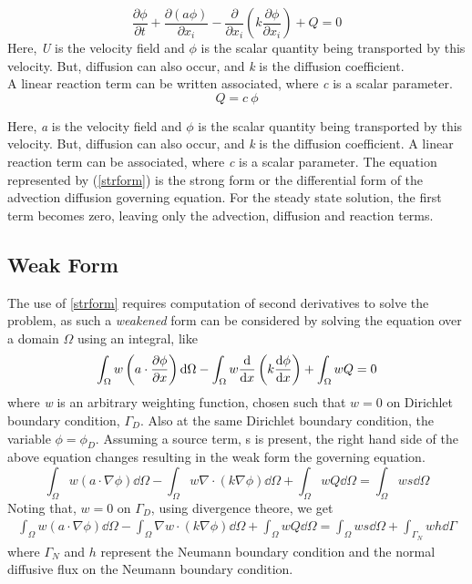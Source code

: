 \documentclass[12pt, oneside]{article}
\begin{document}
    \begin{equation}\label{strform}
	\frac{\partial\phi}{\partial t} + \frac{\partial{(a\phi)}}{\partial{x_i}} - \frac{\partial}{\partial{x_i}} \left( k \frac{\partial\phi}{\partial{x_i}}\right) + Q = 0
   \end{equation}
Here, \textit{U} is the velocity field and $\phi$ is the scalar quantity being transported by this velocity. But, diffusion can also occur, and \textit{k} is the diffusion coefficient.\\
A linear reaction term can be written associated, where \textit{c} is a scalar parameter.
\[
    Q = c\ \phi
\]

Here, \textit{a} is the velocity field and $\phi$ is the scalar quantity being transported by this velocity. But, diffusion can also occur, and \textit{k} is the diffusion coefficient. A linear reaction term can be associated, where \textit{c} is a scalar parameter. The equation represented by (\ref{strform}) is the strong form or the differential form of the advection diffusion governing equation. For the steady state solution, the first term becomes zero, leaving only the advection, diffusion and reaction terms.

\subsection{Weak Form}
The use of \ref{strform} requires computation of second derivatives to solve the problem, as such a \textit{weakened} form can be considered by solving the equation over a domain $\Omega$ using an integral, like
\begin{equation}
    \int_{\Omega}w \left( a\cdot \frac{\partial\phi}{\partial x} \right) \dd \Omega - \int_\Omega w \dv{x}\left( k\dv{\phi}{x} \right) + \int_\Omega w Q = 0
\end{equation}
where \textit{w} is an arbitrary weighting function, chosen such that $w=0$ on Dirichlet boundary condition, $\Gamma_D$. Also at the same Dirichlet boundary condition, the variable $\phi = \phi_D$. Assuming a source term, s is present, the right hand side of the above equation changes resulting in the weak form the governing equation.
\begin{equation}
    \int_{\Omega}w \left( a\cdot \nabla\phi \right) \dd \Omega - \int_\Omega w \nabla\cdot\left( k\nabla\phi \right) \dd\Omega + \int_\Omega w Q \dd\Omega = \int_\Omega w s \dd{\Omega}
\end{equation}
Noting that, $w = 0$ on $\Gamma_D$, using divergence theore, we get 
\begin{equation} \label{weakform}
    \begin{aligned}
	\int_{\Omega}w \left( a\cdot \nabla\phi \right) \dd \Omega - \int_\Omega  \nabla w\cdot\left( k\nabla\phi \right) \dd\Omega + \int_\Omega w Q \dd\Omega = \int_\Omega w s \dd{\Omega} + \int_{\Gamma_N} w h \dd{\Gamma} 
    \end{aligned}
\end{equation}
where $\Gamma_N$ and $h$ represent the Neumann boundary condition and the normal diffusive flux on the Neumann boundary condition.
\end{document}
